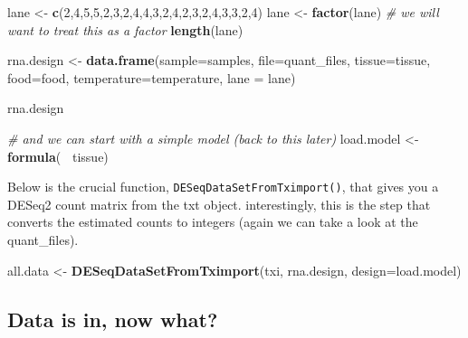 \documentclass[
]{article}
\newenvironment{Shaded}{\begin{snugshade}}{\end{snugshade}}
\newcommand{\CommentTok}[1]{\textcolor[rgb]{0.56,0.35,0.01}{\textit{#1}}}
\newcommand{\DataTypeTok}[1]{\textcolor[rgb]{0.13,0.29,0.53}{#1}}
\newcommand{\DecValTok}[1]{\textcolor[rgb]{0.00,0.00,0.81}{#1}}
\newcommand{\KeywordTok}[1]{\textcolor[rgb]{0.13,0.29,0.53}{\textbf{#1}}}
\newcommand{\NormalTok}[1]{#1}
\newcommand{\OperatorTok}[1]{\textcolor[rgb]{0.81,0.36,0.00}{\textbf{#1}}}
\newcommand{\StringTok}[1]{\textcolor[rgb]{0.31,0.60,0.02}{#1}}
\begin{document}
\begin{Shaded}
\begin{Highlighting}[]
\NormalTok{lane <-}\StringTok{ }\KeywordTok{c}\NormalTok{(}\DecValTok{2}\NormalTok{,}\DecValTok{4}\NormalTok{,}\DecValTok{5}\NormalTok{,}\DecValTok{5}\NormalTok{,}\DecValTok{2}\NormalTok{,}\DecValTok{3}\NormalTok{,}\DecValTok{2}\NormalTok{,}\DecValTok{4}\NormalTok{,}\DecValTok{4}\NormalTok{,}\DecValTok{3}\NormalTok{,}\DecValTok{2}\NormalTok{,}\DecValTok{4}\NormalTok{,}\DecValTok{2}\NormalTok{,}\DecValTok{3}\NormalTok{,}\DecValTok{2}\NormalTok{,}\DecValTok{4}\NormalTok{,}\DecValTok{3}\NormalTok{,}\DecValTok{3}\NormalTok{,}\DecValTok{2}\NormalTok{,}\DecValTok{4}\NormalTok{)}
\NormalTok{lane <-}\StringTok{ }\KeywordTok{factor}\NormalTok{(lane) }\CommentTok{# we will want to treat this as a factor}
\KeywordTok{length}\NormalTok{(lane)}

\NormalTok{rna.design <-}\StringTok{ }\KeywordTok{data.frame}\NormalTok{(}\DataTypeTok{sample=}\NormalTok{samples,}
  \DataTypeTok{file=}\NormalTok{quant_files,}
  \DataTypeTok{tissue=}\NormalTok{tissue,}
  \DataTypeTok{food=}\NormalTok{food,}
  \DataTypeTok{temperature=}\NormalTok{temperature,}
  \DataTypeTok{lane =}\NormalTok{ lane)}

\NormalTok{rna.design}

\CommentTok{# and we can start with a simple model (back to this later)}
\NormalTok{load.model <-}\StringTok{ }\KeywordTok{formula}\NormalTok{(}\OperatorTok{~}\StringTok{ }\NormalTok{tissue)}
\end{Highlighting}
\end{Shaded}

Below is the crucial function, \texttt{DESeqDataSetFromTximport()}, that
gives you a DESeq2 count matrix from the txt object. interestingly, this
is the step that converts the estimated counts to integers (again we can
take a look at the quant\_files).

\begin{Shaded}
\begin{Highlighting}[]
\NormalTok{all.data <-}\StringTok{ }\KeywordTok{DESeqDataSetFromTximport}\NormalTok{(txi, }
\NormalTok{                                     rna.design,}
                                     \DataTypeTok{design=}\NormalTok{load.model)}
\end{Highlighting}
\end{Shaded}

\hypertarget{data-is-in-now-what}{%
\subsection{Data is in, now what?}\label{data-is-in-now-what}}
\end{document}
